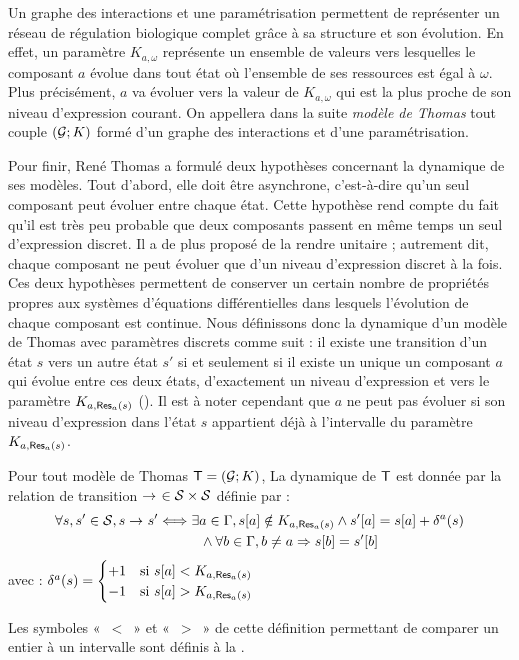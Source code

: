 Un graphe des interactions et une paramétrisation permettent de représenter
un réseau de régulation biologique complet grâce à sa structure et son évolution.
En effet, un paramètre $K_{a,\omega}$ représente un ensemble de valeurs vers lesquelles
le composant $a$ évolue dans tout état où l'ensemble de ses ressources est égal à $\omega$.
Plus précisément, $a$ va évoluer vers la valeur de $K_{a,\omega}$ qui est la plus proche de
son niveau d'expression courant.
On appellera dans la suite \emph{modèle de Thomas} tout couple $(\mathcal{G}; K)$
formé d'un graphe des interactions et d'une paramétrisation.

Pour finir, René Thomas a formulé deux hypothèses concernant la dynamique de ses modèles.
Tout d'abord, elle doit être asynchrone, c'est-à-dire qu'un seul composant peut évoluer
entre chaque état.
Cette hypothèse rend compte du fait qu'il est très peu probable que deux composants passent
en même temps un seul d'expression discret.
Il a de plus proposé de la rendre unitaire ;
autrement dit, chaque composant ne peut évoluer que d'un niveau d'expression discret à la fois.
Ces deux hypothèses permettent de conserver un certain nombre de propriétés propres aux
systèmes d'équations différentielles dans lesquels l'évolution de chaque composant est continue.
Nous définissons donc la dynamique d'un modèle de Thomas avec paramètres discrets comme suit :
il existe une transition d'un état $s$ vers un autre état $s'$ si et seulement si
il existe un unique un composant $a$ qui évolue entre ces deux états,
d'exactement un niveau d'expression et vers le paramètre $K_{a,\mathsf{Res}_{a}(s)}$
().
Il est à noter cependant que $a$ ne peut pas évoluer si son niveau d'expression dans l'état $s$
appartient déjà à l'intervalle du paramètre $K_{a,\mathsf{Res}_{a}(s)}$.

\begin{definition}
  Pour tout modèle de Thomas $\mathsf{T} = (\mathcal{G}; K)$,
  La dynamique de $\mathsf{T}$ est donnée par la relation de transition
  $\rightarrow_{}\ \in \mathcal{S} \times \mathcal{S}$ définie par :
  \begin{align*}
    \forall s, s' \in \mathcal{S}, s \rightarrow_{} s'
      &\Longleftrightarrow \exists a \in \Gamma,
    {s[a]} \notin K_{a, \mathsf{Res}_{a}(s)} \wedge
      {s'[a]} = {s[a]} + \delta^a(s) \\
      &\qquad\quad \wedge \forall b \in \Gamma, b \neq a \Rightarrow {s[b]} = {s'[b]}
  \end{align*}
  avec : $\delta^a(s) = 
    \begin{cases}
      +1 & \text{si } {s[a]} < K_{a, \mathsf{Res}_{a}(s)} \\
      -1 & \text{si } {s[a]} > K_{a, \mathsf{Res}_{a}(s)} \\
    \end{cases}$
\end{definition}
Les symboles «~$<$~» et «~$>$~» de cette définition permettant de comparer un entier à
un intervalle sont définis à la .



